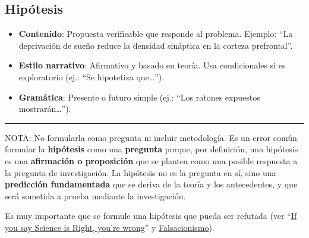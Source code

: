 \documentclass[
  10pt]{article}
\begin{document}
\subsection{Hipótesis}\label{hipuxf3tesis}

\begin{tcolorbox}[enhanced jigsaw, colframe=quarto-callout-tip-color-frame, bottomtitle=1mm, toptitle=1mm, left=2mm, arc=.35mm, toprule=.15mm, colback=white, coltitle=black, leftrule=.75mm, breakable, opacityback=0, titlerule=0mm, title=\textcolor{quarto-callout-tip-color}{\faLightbulb}\hspace{0.5em}{Tip}, rightrule=.15mm, opacitybacktitle=0.6, bottomrule=.15mm, colbacktitle=quarto-callout-tip-color!10!white]

\begin{itemize}
\item
  \textbf{Contenido}: Propuesta verificable que responde al problema.
  Ejemplo: ``La deprivación de sueño reduce la densidad sináptica en la
  corteza prefrontal''.
\item
  \textbf{Estilo narrativo}: Afirmativo y basado en teoría. Usa
  condicionales si es exploratorio (ej.: ``Se hipotetiza que\ldots{}'').
\item
  \textbf{Gramática}: Presente o futuro simple (ej.: ``Los ratones
  expuestos mostrarán\ldots{}'').
\end{itemize}

\begin{center}\rule{0.5\linewidth}{0.5pt}\end{center}

\begin{tcolorbox}[enhanced jigsaw, colframe=quarto-callout-tip-color-frame, bottomtitle=1mm, toptitle=1mm, left=2mm, arc=.35mm, toprule=.15mm, colback=white, coltitle=black, leftrule=.75mm, breakable, opacityback=0, titlerule=0mm, title=\textcolor{quarto-callout-tip-color}{\faLightbulb}\hspace{0.5em}{Tip}, rightrule=.15mm, opacitybacktitle=0.6, bottomrule=.15mm, colbacktitle=quarto-callout-tip-color!10!white]

NOTA: No formularla como pregunta ni incluir metodología. Es un error
común formular la \textbf{hipótesis} como una \textbf{pregunta} porque,
por definición, una hipótesis es una \textbf{afirmación o proposición}
que se plantea como una posible respuesta a la pregunta de
investigación. La hipótesis no es la pregunta en sí, sino una
\textbf{predicción fundamentada} que se deriva de la teoría y los
antecedentes, y que será sometida a prueba mediante la investigación.

Es muy importante que se formule una hipótesis que pueda ser refutada
(ver
``\href{https://www.scientificamerican.com/article/if-you-say-science-is-right-youre-wrong/}{If
you say Science is Right, you're wrong}'' y
\href{https://es.wikipedia.org/wiki/Falsacionismo}{Falsacionismo}).

\end{tcolorbox}

\end{tcolorbox}
\end{document}
